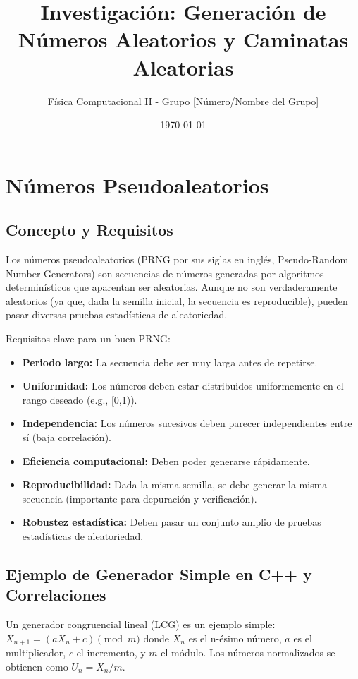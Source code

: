 \documentclass[11pt,a4paper]{article}
\title{Investigación: Generación de Números Aleatorios y Caminatas Aleatorias}
\author{Física Computacional II - Grupo [Número/Nombre del Grupo]}
\date{\today}
\begin{document}
\maketitle

\section{Números Pseudoaleatorios}
\subsection{Concepto y Requisitos}
Los números pseudoaleatorios (PRNG por sus siglas en inglés, Pseudo-Random Number Generators) son secuencias de números generadas por algoritmos determinísticos que aparentan ser aleatorias. Aunque no son verdaderamente aleatorios (ya que, dada la semilla inicial, la secuencia es reproducible), pueden pasar diversas pruebas estadísticas de aleatoriedad.

Requisitos clave para un buen PRNG:
\begin{itemize}
    \item \textbf{Periodo largo:} La secuencia debe ser muy larga antes de repetirse.
    \item \textbf{Uniformidad:} Los números deben estar distribuidos uniformemente en el rango deseado (e.g., [0,1)).
    \item \textbf{Independencia:} Los números sucesivos deben parecer independientes entre sí (baja correlación).
    \item \textbf{Eficiencia computacional:} Deben poder generarse rápidamente.
    \item \textbf{Reproducibilidad:} Dada la misma semilla, se debe generar la misma secuencia (importante para depuración y verificación).
    \item \textbf{Robustez estadística:} Deben pasar un conjunto amplio de pruebas estadísticas de aleatoriedad.
\end{itemize}

\subsection{Ejemplo de Generador Simple en C++ y Correlaciones}
Un generador congruencial lineal (LCG) es un ejemplo simple:
$X_{n+1} = (a X_n + c) \pmod m$
donde $X_n$ es el n-ésimo número, $a$ es el multiplicador, $c$ el incremento, y $m$ el módulo.
Los números normalizados se obtienen como $U_n = X_n / m$.
\end{document}
